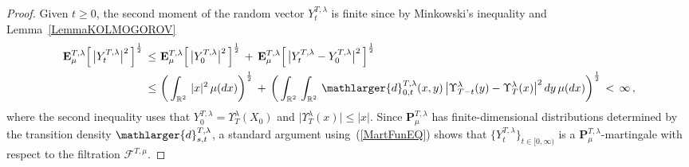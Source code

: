 \documentclass[10pt]{article}
\numberwithin{equation}{section}
\theoremstyle{definition}
\newcommand{\R}{{\mathbb R}}
\newcommand{\Rphi}{{\Upsilon}}
\begin{document}
\begin{appendix}
\begin{proof} Given $t\geq 0$, the second moment of the random vector $Y^{T,\lambda}_t $ is finite since by Minkowski's inequality and Lemma~\ref{LemmaKOLMOGOROV}
\begin{align*}
    \mathbf{E}_{\mu}^{T,\lambda}\Big[\,\big|Y^{T,\lambda}_t \big|^{2}  \,\Big]^{\frac{1}{2}}\,\leq \,&\,\mathbf{E}_{\mu}^{T,\lambda}\Big[\,\big|Y^{T,\lambda}_0 \big|^{2}\,  \Big]^{\frac{1}{2}}\,+\, \mathbf{E}_{\mu}^{T,\lambda}\Big[\,\big|Y^{T,\lambda}_t-Y^{T,\lambda}_0 \big|^{2}  \,\Big]^{\frac{1}{2}}\\
    \,\leq  \,&\, \bigg( \int_{\R^2}\,|x|^2\,\mu(dx) \bigg)^{\frac{1}{2}}\,+\,\bigg(\int_{\R^2}\,\int_{\R^2} \, \mathlarger{d}_{0,t}^{T,\lambda}(x,y)\,\big|\Rphi_{T-t}^{\lambda}(y)-\Rphi_{T}^{\lambda}(x)   \big|^{2}\, dy \,\mu(dx)\bigg)^{\frac{1}{2}}\,<\,\infty\,,
\end{align*}
where the second inequality uses that $Y^{T,\lambda}_0=\Rphi_{T}^{\lambda}(X_0) $ and $\big|\Rphi_{T}^{\lambda}(x)\big|\leq |x|$.  Since $ \mathbf{P}_{\mu}^{T,\lambda}$ has finite-dimensional distributions determined by the transition density $\mathlarger{d}_{s,t}^{T,\lambda}$,  a standard argument using~(\ref{MartFunEQ}) shows that  $\{ Y_{t}^{T,\lambda}   \}_{t\in [0,\infty)}$ is a $ \mathbf{P}_{\mu}^{T,\lambda}$-martingale with respect to the filtration  $\mathscr{F}^{T,\mu}$.


\end{proof}
\end{appendix}
\end{document}
